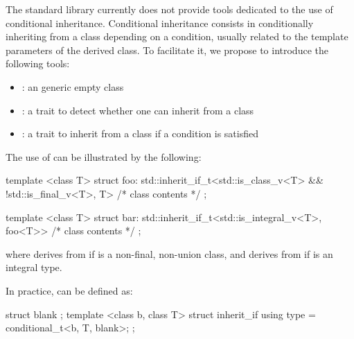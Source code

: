 \documentclass[ebook,10pt,oneside,openany,final]{memoir}
\begin{document}
The standard library currently does not provide tools dedicated to the use of conditional inheritance. Conditional inheritance consists in conditionally inheriting from a class depending on a condition, usually related to the template parameters of the derived class. To facilitate it, we propose to introduce the following tools:
\begin{itemize}
\item {}: an generic empty class
\item {}: a trait to detect whether one can inherit from a class
\item {}: a trait to inherit from a class if a condition is satisfied
\end{itemize}

The use of  can be illustrated by the following:
\begin{codeblock}
template <class T>
struct foo: std::inherit_if_t<std::is_class_v<T> && !std::is_final_v<T>, T> {
    /* class contents */
};

template <class T>
struct bar: std::inherit_if_t<std::is_integral_v<T>, foo<T>> {
    /* class contents */
};
\end{codeblock}
where  derives from  if  is a non-final, non-union class, and  derives from  if  is an integral type.

In practice,  can be defined as:
\begin{codeblock}
struct blank {};
template <class b, class T> struct inherit_if {
    using type = conditional_t<b, T, blank>;
};
\end{codeblock}
\end{document}
